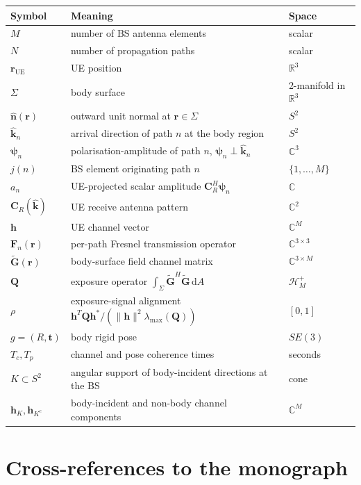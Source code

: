 \documentclass[11pt,a4paper]{article}
\theoremstyle{definition}
\newcommand{\rr}{\mathbf{r}}
\newcommand{\hh}{\mathbf{h}}
\newcommand{\nh}{\hat{\mathbf{n}}}
\newcommand{\kh}{\hat{\mathbf{k}}}
\newcommand{\Q}{\mathbf{Q}}
\newcommand{\Gt}{\tilde{\mathbf{G}}}
\newcommand{\F}{\mathbf{F}}
\newcommand{\Cp}{\mathbf{C}}
\newcommand{\psib}{\boldsymbol{\psi}}
\newcommand{\Sigmaset}{\Sigma}
\newcommand{\C}{\mathbb{C}}
\newcommand{\R}{\mathbb{R}}
\newcommand{\lammax}{\lambda_{\max}}
\newcommand{\diff}{\mathrm{d}}
\begin{document}
\begin{center}
\small
\begin{tabular}{lp{8cm}l}
\toprule
Symbol & Meaning & Space \\
\midrule
$M$ & number of BS antenna elements & scalar \\
$N$ & number of propagation paths & scalar \\
$\rr_{\mathrm{UE}}$ & UE position & $\R^3$ \\
$\Sigmaset$ & body surface & 2-manifold in $\R^3$ \\
$\nh(\rr)$ & outward unit normal at $\rr\in\Sigmaset$ & $S^2$ \\
$\kh_n$ & arrival direction of path $n$ at the body region & $S^2$ \\
$\psib_n$ & polarisation-amplitude of path $n$, $\psib_n\perp\kh_n$ & $\C^3$ \\
$j(n)$ & BS element originating path $n$ & $\{1,\dots,M\}$ \\
$a_n$ & UE-projected scalar amplitude $\Cp_R^H\psib_n$ & $\C$ \\
$\Cp_R(\kh)$ & UE receive antenna pattern & $\C^2$ \\
$\hh$ & UE channel vector & $\C^M$ \\
$\F_n(\rr)$ & per-path Fresnel transmission operator & $\C^{3\times 3}$ \\
$\Gt(\rr)$ & body-surface field channel matrix & $\C^{3\times M}$ \\
$\Q$ & exposure operator $\int_\Sigmaset \Gt^H\Gt\,\diff A$ & $\mathcal{H}_M^+$ \\
$\rho$ & exposure-signal alignment $\hh^T\Q\hh^*/(\|\hh\|^2\lammax(\Q))$ & $[0,1]$ \\
$g=(R,\mathbf{t})$ & body rigid pose & $SE(3)$ \\
$T_c, T_p$ & channel and pose coherence times & seconds \\
$K\subset S^2$ & angular support of body-incident directions at the BS & cone \\
$\hh_K, \hh_{K^c}$ & body-incident and non-body channel components & $\C^M$ \\
\bottomrule
\end{tabular}
\end{center}

\section{Cross-references to the monograph}
\label{app:xrefs}
\end{document}
